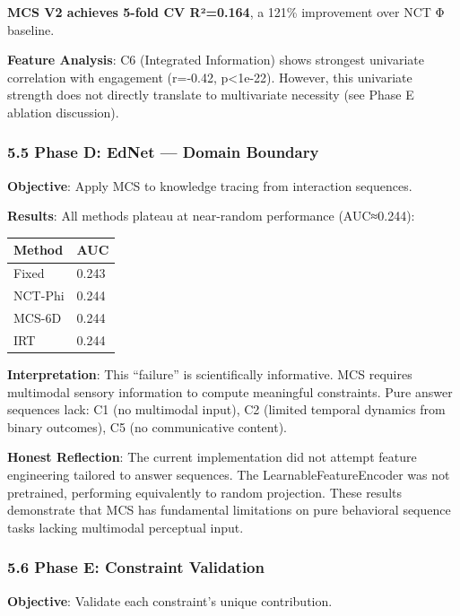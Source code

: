 \documentclass[
]{article}
\newcounter{none} %
\begin{document}
\textbf{MCS V2 achieves 5-fold CV R²=0.164}, a 121\% improvement over
NCT Φ baseline.

\textbf{Feature Analysis}: C6 (Integrated Information) shows strongest
univariate correlation with engagement (r=-0.42, p\textless1e-22).
However, this univariate strength does not directly translate to
multivariate necessity (see Phase E ablation discussion).

\subsubsection{5.5 Phase D: EdNet --- Domain
Boundary}\label{phase-d-ednet-domain-boundary}

\textbf{Objective}: Apply MCS to knowledge tracing from interaction
sequences.

\textbf{Results}: All methods plateau at near-random performance
(AUC≈0.244):

{\def\LTcaptype{none} %
\begin{longtable}[]{@{}ll@{}}
\toprule\noalign{}
Method & AUC \\
\midrule\noalign{}
\endhead
\bottomrule\noalign{}
\endlastfoot
Fixed & 0.243 \\
NCT-Phi & 0.244 \\
MCS-6D & 0.244 \\
IRT & 0.244 \\
\end{longtable}
}

\textbf{Interpretation}: This ``failure'' is scientifically informative.
MCS requires multimodal sensory information to compute meaningful
constraints. Pure answer sequences lack: C1 (no multimodal input), C2
(limited temporal dynamics from binary outcomes), C5 (no communicative
content).

\textbf{Honest Reflection}: The current implementation did not attempt
feature engineering tailored to answer sequences. The
LearnableFeatureEncoder was not pretrained, performing equivalently to
random projection. These results demonstrate that MCS has fundamental
limitations on pure behavioral sequence tasks lacking multimodal
perceptual input.

\subsubsection{5.6 Phase E: Constraint
Validation}\label{phase-e-constraint-validation}

\textbf{Objective}: Validate each constraint's unique contribution.
\end{document}
